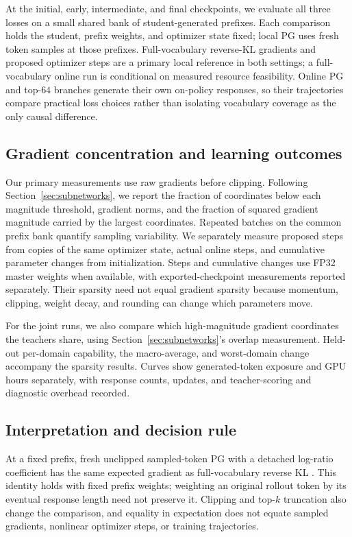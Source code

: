 At the initial, early, intermediate, and final checkpoints, we evaluate
all three losses on a small shared bank of student-generated prefixes.
Each comparison holds the student, prefix weights, and optimizer state
fixed; local PG uses fresh token samples at those prefixes.
Full-vocabulary reverse-KL gradients and proposed optimizer steps
are a primary local reference in both settings; a full-vocabulary online
run is conditional on measured resource feasibility. Online PG and
top-$64$ branches generate their own on-policy responses, so their
trajectories compare practical loss choices rather than isolating
vocabulary coverage as the only causal difference.

\subsection{Gradient concentration and learning outcomes}

Our primary measurements use raw gradients before clipping. Following
Section~\ref{sec:subnetworks}, we report the fraction of coordinates below
each magnitude threshold, gradient norms, and the fraction of squared
gradient magnitude carried by the largest coordinates. Repeated batches
on the common prefix bank quantify sampling variability. We separately
measure proposed steps from copies of the same optimizer state, actual
online steps, and cumulative parameter changes from initialization.
Steps and cumulative changes use FP32 master weights when available,
with exported-checkpoint measurements reported separately. Their
sparsity need not equal gradient sparsity because momentum, clipping,
weight decay, and rounding can change which parameters move.

For the joint runs, we also compare which high-magnitude gradient
coordinates the teachers share, using Section~\ref{sec:subnetworks}'s
overlap measurement. Held-out per-domain capability, the macro-average,
and worst-domain change accompany the sparsity results. Curves show
generated-token exposure and GPU hours separately, with response counts,
updates, and teacher-scoring and diagnostic overhead recorded.

\subsection{Interpretation and decision rule}

At a fixed prefix, fresh unclipped sampled-token PG with a detached
log-ratio coefficient has the same expected gradient as full-vocabulary
reverse KL \citep{yu2026denseupdates,oh2026vopd}. This identity holds with
fixed prefix weights; weighting an original rollout token by its eventual
response length need not preserve it. Clipping and top-$k$ truncation
also change the comparison, and equality in expectation does not equate
sampled gradients, nonlinear optimizer steps, or training trajectories.

